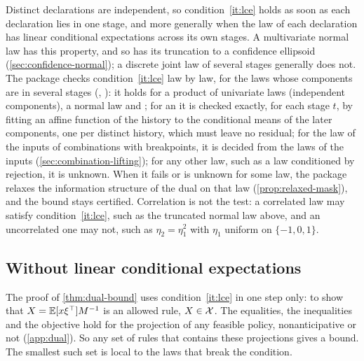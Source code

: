 \begin{remark}
\label{rem:lce}
Distinct declarations are independent, so condition~\ref{it:lce} holds as soon as each declaration lies in one stage,
and more generally when the law of each declaration has linear conditional expectations across its own stages.
A multivariate normal law has this property, and so has its truncation to a confidence ellipsoid (\cref{sec:confidence-normal});
a discrete joint law of several stages generally does not.
The package checks condition~\ref{it:lce} law by law, for the laws whose components are in several stages (, ):
it holds for a product of univariate laws (independent components), a normal law and ;
for an  it is checked exactly, for each stage $t$, by fitting an affine function of the history to the conditional means of the later components, one per distinct history, which must leave no residual;
for the law of the inputs of combinations with breakpoints, it is decided from the laws of the inputs (\cref{sec:combination-lifting});
for any other law, such as a law conditioned by rejection, it is unknown.
When it fails or is unknown for some law, the package relaxes the information structure of the dual on that law (\cref{prop:relaxed-mask}), and the bound stays certified.
Correlation is not the test: a correlated law may satisfy condition~\ref{it:lce}, such as the truncated normal law above,
and an uncorrelated one may not, such as $\eta_2 = \eta_1^2$ with $\eta_1$ uniform on $\{-1, 0, 1\}$.
\end{remark}

\subsection{Without linear conditional expectations}

The proof of \cref{thm:dual-bound} uses condition~\ref{it:lce} in one step only: to show that $X = \mathbb{E}[x\xi^\top]M^{-1}$ is an allowed rule, $X \in \mathcal{X}$.
The equalities, the inequalities and the objective hold for the projection of any feasible policy, nonanticipative or not (\cref{app:dual}).
So any set of rules that contains these projections gives a bound.
The smallest such set is local to the laws that break the condition.


